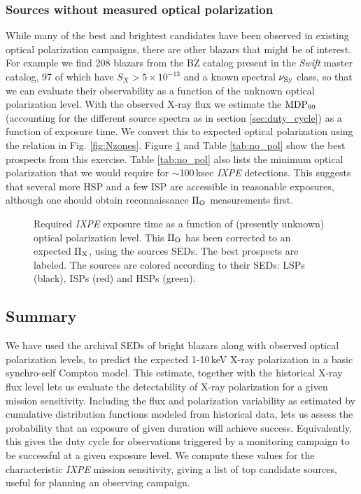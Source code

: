 \subsubsection{Sources without measured optical polarization}

While many of the best and brightest candidates have been observed in existing optical
polarization campaigns, there are other blazars that might be of interest. For example we find
208 blazars from the BZ catalog \citep{massaro_5th_2015} present in the {\it Swift} master catalog,
97 of which have $S_X>5\times10^{-13}$ and a known spectral $\rm \nu_{Sy}$ class, so that
we can evaluate their observability as a function of the
unknown optical polarization level. With the observed X-ray flux we estimate 
the $\rm MDP_{99}$ (accounting for the different source spectra as in section \ref{sec:duty_cycle}) as a function of exposure time. We convert this to expected optical polarization 
using the relation in Fig. \ref{fig:Nzones}. Figure \ref{fig:nopol} and Table \ref{tab:no_pol} show 
the best prospects from this exercise. Table \ref{tab:no_pol} also lists the 
minimum optical polarization that we would require for $\sim$100\,ksec {\it IXPE} detections.
This suggests that several more HSP and a few ISP are accessible in reasonable 
exposures, although one should obtain reconnaissance $\rm \Pi_O$ measurements first.

\begin{figure}
\centering
\caption{Required {\it IXPE} exposure time as a function of (presently unknown) optical polarization level.
This $\rm \Pi_O$ has been corrected to an expected $\rm \Pi_X$, using the sources SEDs. The best prospects are
labeled. The sources are colored according to their SEDs: LSPs (black), ISPs (red) and HSPs (green).}
\label{fig:nopol}
\end{figure}


\subsection{Summary}
\label{sec:sum}

We have used the archival SEDs of bright blazars along with observed optical
polarization levels, to predict the expected 1-10\,keV X-ray polarization in a basic 
synchro-self Compton model. This estimate, together with the historical X-ray flux level
lets us evaluate the detectability of X-ray polarization for a given mission sensitivity.
Including the flux and polarization variability as estimated by cumulative distribution
functions modeled from historical data, lets us assess the probability that an exposure of given duration will achieve success. Equivalently, this gives the duty cycle for observations triggered by a monitoring campaign to be successful at a given exposure level. We compute these
values for the characteristic {\it IXPE} mission sensitivity, giving a list of top candidate 
sources, useful for planning an observing campaign. 

